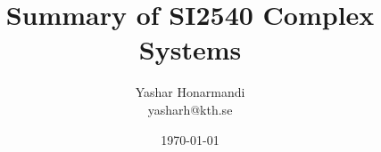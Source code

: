 \documentclass[a4paper, 11pt]{article}
\title{Summary of SI2540 Complex Systems}
\author{Yashar Honarmandi \\ yasharh@kth.se}
\date{\today}
\begin{document}
\maketitle

\begin{abstract}
	
\end{abstract}

\thispagestyle{empty}

\newpage

\tableofcontents

\newpage



\end{document}
